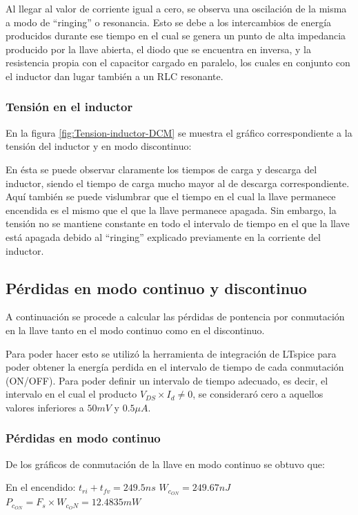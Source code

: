 \documentclass[e4_tp1_main.tex]{subfiles}
\begin{document}
	Al llegar al valor de corriente igual a cero, se observa una oscilación de la misma a modo de ``ringing'' o resonancia. Esto se debe a los intercambios de energía producidos durante ese tiempo en el cual se genera un punto de alta impedancia producido por la llave abierta, el diodo que se encuentra en inversa, y la resistencia propia con el capacitor cargado en paralelo, los cuales en conjunto con el inductor dan lugar también a un RLC resonante.
	
	\subsubsection{Tensión en el inductor}
	En la figura \ref{fig:Tension-inductor-DCM} se muestra el gráfico correspondiente a la tensión del inductor y en modo discontinuo:

	En ésta se puede observar claramente los tiempos de carga y descarga del inductor, siendo el tiempo de  carga mucho mayor al de descarga correspondiente. Aquí también se puede vislumbrar que el tiempo en el cual la llave permanece encendida es el mismo que el que la llave permanece apagada. Sin embargo, la tensión no se mantiene constante en todo el intervalo de tiempo en el que la llave está apagada debido al ``ringing'' explicado previamente en la corriente del inductor.
		

	\subsection{Pérdidas en modo continuo y discontinuo}
	A continuación se procede a calcular las pérdidas de pontencia por conmutación en la llave tanto en el modo continuo como en el discontinuo. 
	
	Para poder hacer esto se utilizó la herramienta de integración de LTspice para poder obtener la energía perdida en el intervalo de tiempo de cada conmutación (ON/OFF). Para poder definir un intervalo de tiempo adecuado, es decir, el intervalo en el cual el producto $V_{DS}\times I_d\neq 0$, se consideraró cero a aquellos valores inferiores a $50mV$ y $0.5\mu A$.
	
	\subsubsection{Pérdidas en modo continuo}
	De los gráficos de conmutación de la llave en modo continuo se obtuvo que:
	
	En el encendido: $t_{ri}+t_{fv}=249.5ns$  \quad $W_{c_{ON}}=249.67nJ$ \quad \quad$P_{c_{ON}}=F_s\times W_{c_ON}=12.4835mW$
\end{document}
